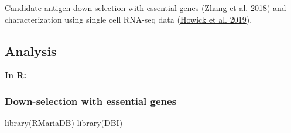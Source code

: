 \documentclass[
  11pt,
  oneside]{book}
\newenvironment{Shaded}{\begin{snugshade}}{\end{snugshade}}
\newcommand{\FunctionTok}[1]{\textcolor[rgb]{0.00,0.00,0.00}{#1}}
\newcommand{\NormalTok}[1]{#1}
\begin{document}
Candidate antigen down-selection with essential genes (\protect\hyperlink{ref-Zhang:2018ug}{Zhang et al. 2018}) and characterization using single cell RNA-seq data (\protect\hyperlink{ref-Howick:2019uo}{Howick et al. 2019}).

\hypertarget{analysis-8}{%
\subsection{Analysis}\label{analysis-8}}

\textbf{In R: }

\hypertarget{down-selection-with-essential-genes}{%
\subsubsection{Down-selection with essential genes}\label{down-selection-with-essential-genes}}

\begin{Shaded}
\begin{Highlighting}[]
\FunctionTok{library}\NormalTok{(RMariaDB)}
\FunctionTok{library}\NormalTok{(DBI)}
\end{Highlighting}
\end{Shaded}
\end{document}
